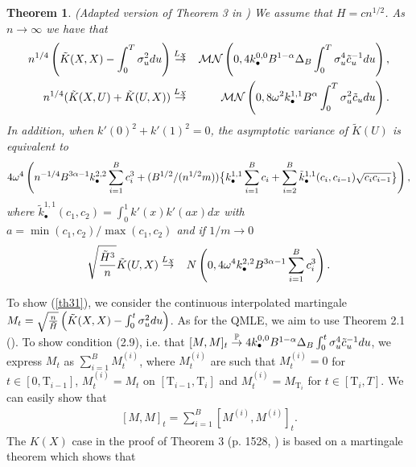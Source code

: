 \documentclass[11pt]{article}
\numberwithin{equation}{section}
\newcommand{\Tau}{\mathrm{T}}
\theoremstyle{plain}
\newtheorem{RKth3}[RK0]{Theorem}
\theoremstyle{remark}
\begin{document}
\begin{RKth3} (Adapted version of Theorem 3 in \cite{barndorff2008designing}) We assume that $H = c n^{1/2}$. As $n \rightarrow \infty$ we have that
\begin{eqnarray}
\label{th31} n^{1/4} \left( \tilde{K}(X,X) - \int_0^T \sigma_u^2 du \right) & \overset{L_X}{\rightarrow} & {\cal M}{\cal N} \left(0, 4 k_{\bullet}^{0,0} B^{1 - \alpha} \Delta_B \int_0^T \sigma_u^4 \tilde{c}_u^{-1} du \right),\\
\label{th32} n^{1/4} ( \tilde{K} (X,U) + \tilde{K} (U,X) ) & \overset{L_X}{\rightarrow} &  {\cal M}{\cal N} \left(0, 8 \omega^2 k_{\bullet}^{1,1} B^{\alpha} \int_0^T \sigma_u^2 \tilde{c}_u du \right).
\end{eqnarray}
In addition, when $k'(0)^2 + k'(1)^2 = 0$, the asymptotic variance of $\tilde{K} (U)$ is equivalent to
\begin{eqnarray}
\label{th34} 4 \omega^4 \left( n^{-1/4} B^{3 \alpha - 1} k_{\bullet}^{2,2} \sum_{i=1}^{B} c_i^{3}  + (B^{1/2}/(n^{1/2} m))  \big\{k_{\bullet}^{1,1} \sum_{i=1}^{B} c_i + \sum_{i=2}^{B} \tilde{k}_{\bullet}^{1,1} (c_i, c_{i-1}) \sqrt{c_i c_{i-1}} \big\} \right), 
\end{eqnarray}
where $\tilde{k}_{\bullet}^{1,1} (c_1, c_{2}) = \int_0^1 k'(x) k'(ax) dx$ with $a = \min(c_1, c_2)/ \max(c_1, c_2)$ and if $ 1/m \rightarrow 0$
\begin{eqnarray}
\label{th35}
 \sqrt{\frac{\tilde{H}^3}{n}} \tilde{K} (U,X)  & \overset{L_X}{\rightarrow} &  N \left(0, 4 \omega^4 k_{\bullet}^{2,2} B^{3 \alpha - 1} \sum_{i=1}^{B} c_i^3 \right).
\end{eqnarray}
\end{RKth3}
To show (\ref{th31}), we consider the continuous interpolated martingale $M_t = \sqrt{\frac{n}{\tilde{H}}} \left( \tilde{K}(X,X) - \int_0^t \sigma_u^2 du \right)$. As for the QMLE, we aim to use Theorem 2.1 (\cite{jacod1997}). To show condition (2.9), i.e. that $[M, M]_t \overset{\mathbb{P}}{\rightarrow} 4 k_{\bullet}^{0,0} B^{1 - \alpha} \Delta_B \int_0^t \sigma_u^4 \tilde{c}_u^{-1} du$, we express $M_t$ as $\sum_{i=1}^B M_t^{(i)}$, where $M_t^{(i)}$ are such that $M_t^{(i)} = 0$ for $t \in [0,\Tau_{i-1}]$, $M_t^{(i)} = M_t$ on $[\Tau_{i-1}, \Tau_i]$ and $M_t^{(i)} = M_{\Tau_i}$ for $t \in [\Tau_i, T]$. We can easily show that 
\begin{eqnarray}
\label{MM} [ M, M]_t = \sum_{i=1}^{B} [M^{(i)}, M^{(i)}]_{t}.
\end{eqnarray}
The $K(X)$ case in the proof of Theorem 3 (p. 1528, \cite{barndorff2008designing}) is based on a martingale theorem which shows that 
\end{document}
